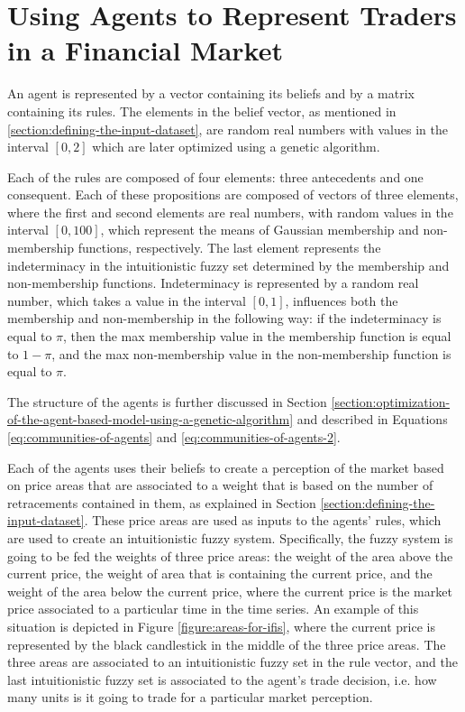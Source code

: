\section{Using Agents to Represent Traders in a Financial Market}
\label{section:using-agents-to-represent-traders-in-a-financial-market:implementation}

An agent is represented by a vector containing its beliefs and by a matrix
containing its rules. The elements in the belief vector, as mentioned in
\ref{section:defining-the-input-dataset}, are random real numbers with values in
the interval $[0, 2]$ which are later optimized using a genetic algorithm.

Each of the rules are composed of four elements: three antecedents and one
consequent. Each of these propositions are composed of vectors of three
elements, where the first and second elements are real numbers, with random
values in the interval $[0, 100]$, which represent the means of Gaussian
membership and non-membership functions, respectively. The last element
represents the indeterminacy in the intuitionistic fuzzy set determined by the
membership and non-membership functions. Indeterminacy is represented by a
random real number, which takes a value in the interval $[0, 1]$, influences
both the membership and non-membership in the following way: if the
indeterminacy is equal to $\pi$, then the max membership value in the membership
function is equal to $1 - \pi$, and the max non-membership value in the
non-membership function is equal to $\pi$.

The structure of the agents is further discussed in Section \ref{section:optimization-of-the-agent-based-model-using-a-genetic-algorithm}
and described in Equations \ref{eq:communities-of-agents} and \ref{eq:communities-of-agents-2}.

Each of the agents uses their beliefs to create a perception of the market based
on price areas that are associated to a weight that is based on the number of
retracements contained in them, as explained in Section
\ref{section:defining-the-input-dataset}. These price areas are used as inputs
to the agents' rules, which are used to create an intuitionistic fuzzy
system. Specifically, the fuzzy system is going to be fed the weights of three
price areas: the weight of the area above the current price, the weight of area
that is containing the current price, and the weight of the area below the
current price, where the current price is the market price associated to a
particular time in the time series. An example of this situation is depicted in
Figure \ref{figure:areas-for-ifis}, where the current price is represented by
the black candlestick in the middle of the three price areas. The three areas
are associated to an intuitionistic fuzzy set in the rule vector, and the last
intuitionistic fuzzy set is associated to the agent's trade decision, i.e. how
many units is it going to trade for a particular market perception.

